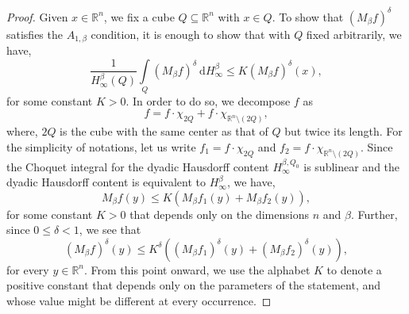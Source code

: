 \documentclass{amsart}
\numberwithin{theorem}{section}
\numberwithin{equation}{section}
\begin{document}
		\begin{proof}
			Given $x \in \mathbb{R}^n$, we fix a cube $Q \subseteq \mathbb{R}^n$ with $x \in Q$. To show that $\left( M_{\beta}f \right)^{\delta}$ satisfies the $A_{1, \beta}$ condition, it is enough to show that with $Q$ fixed arbitrarily, we have,
			\begin{equation}
				\label{GoalEquation}
				\frac{1}{H^{\beta}_{\infty} \left( Q \right)} \int\limits_{Q} \left( M_{\beta}f \right)^{\delta} \ \mathrm{d}H^{\beta}_{\infty} \leq K \left( M_{\beta}f \right)^{\delta} \left( x \right),
			\end{equation}
			for some constant $K > 0$. In order to do so, we decompose $f$ as
			$$f = f \cdot \chi_{2Q} + f \cdot \chi_{\mathbb{R}^n \setminus \left( 2Q \right)},$$
			where, $2Q$ is the cube with the same center as that of $Q$ but twice its length. For the simplicity of notations, let us write $f_1 = f \cdot \chi_{2Q}$ and $f_2 = f \cdot \chi_{\mathbb{R}^n \setminus \left( 2Q \right)}$. Since the Choquet integral for the dyadic Hausdorff content $H^{\beta, Q_0}_{\infty}$ is sublinear and the dyadic Hausdorff content is equivalent to $H^{\beta}_{\infty}$, we have,
			$$M_{\beta}f \left( y \right) \leq K \left( M_{\beta}f_1 \left( y \right) + M_{\beta}f_2 \left( y \right) \right),$$
			for some constant $K > 0$ that depends only on the dimensions $n$ and $\beta$. Further, since $0 \leq \delta < 1$, we see that
			$$\left( M_{\beta}f \right)^{\delta} \left( y \right) \leq K^{\delta} \left( \left( M_{\beta}f_1 \right)^{\delta} \left( y \right) + \left( M_{\beta}f_2 \right)^{\delta} \left( y \right) \right),$$
			for every $y \in \mathbb{R}^n$. From this point onward, we use the alphabet $K$ to denote a positive constant that depends only on the parameters of the statement, and whose value might be different at every occurrence.
			

\end{proof}
\end{document}
